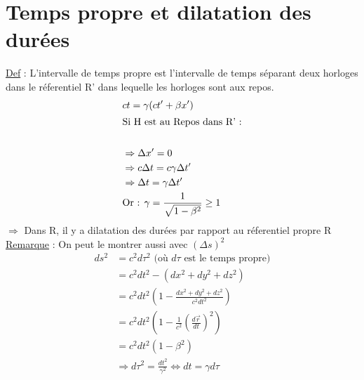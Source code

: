 \documentclass{article}
\begin{document}
\section{Temps propre et dilatation des durées}
\underline{Def} : L'intervalle de temps propre est l'intervalle de temps séparant deux horloges dans le réferentiel R' dans lequelle les horloges sont aux repos.
\begin{equation*}
\end{equation*}
\begin{align*}
    &ct = \gamma(ct'+\beta x')\\
    \intertext{Si H est au Repos dans R' :}\\
    &\Rightarrow \Delta x' = 0\\
    &\Rightarrow c\Delta t = c\gamma\Delta t'\\
    &\Rightarrow \Delta t = \gamma \Delta t'\\
    &\text{Or : } \gamma = \frac{1}{\sqrt{1-\beta^2}} \geq 1
\end{align*}
$\Rightarrow$ Dans R, il y a dilatation des durées par rapport au réferentiel propre R\\
\underline{Remarque} : On peut le montrer aussi avec $(\Delta s)^2$ \\
\begin{align*}
    ds^2 &= c^2 d\tau^2 \text{       (où $d\tau$ est le temps propre)}\\
    &= c^2 dt^2 -(dx^2 +dy^2 + dz^2)\\
    &= c^2 dt^2 (1-\frac{dx^2+dy^2+dz^2}{c^2dt^2})\\
    &= c^2 dt^2(1-\frac{1}{c^2}(\frac{d\vec{r}}{dt})^2)\\
    &=c^2dt^2 (1-\beta^2)\\
    &\Rightarrow d\tau^2 = \frac{dt^2}{\gamma^2} \Leftrightarrow dt = \gamma d\tau
\end{align*}
\end{document}
